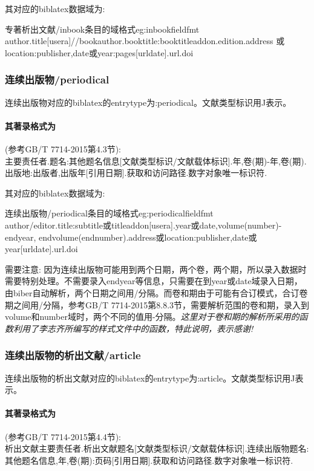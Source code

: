 其对应的biblatex数据域为:
\begin{codetex}{专著析出文献/inbook条目的域格式}{eg:inbookfieldfmt}
author.title[usera]//bookauthor.booktitle:booktitleaddon.edition.address 或location:publisher,date或year:pages[urldate].url.doi
\end{codetex}

\subsubsection{连续出版物/periodical}
\begin{refentry}{}{}
连续出版物对应的biblatex的entrytype为:periodical。文献类型标识用J表示。

\paragraph{其著录格式为}(参考GB/T 7714-2015第4.3节):\\
主要责任者.题名:其他题名信息[文献类型标识/文献载体标识].年,卷(期)-年,卷(期).出版地:出版者,出版年[引用日期].获取和访问路径.数字对象唯一标识符.
\end{refentry}

其对应的biblatex数据域为:
\begin{codetex}{连续出版物/periodical条目的域格式}{eg:periodicalfieldfmt}
author/editor.title:subtitle或titleaddon[usera].year或date,volume(number)-endyear, endvolume(endnumber).address或location:publisher,date或year[urldate].url.doi
\end{codetex}

需要注意: 因为连续出版物可能用到两个日期，两个卷，两个期，所以录入数据时需要特别处理。不需要录入endyear等信息，只需要在到year或date域录入日期，由biber自动解析，两个日期之间用/分隔。而卷和期由于可能有合订模式，合订卷期之间用/分隔，参考GB/T 7714-2015第8.8.3节，需要解析范围的卷和期，录入到volume和number域时，两个不同的值用-分隔。\emph{这里对于卷和期的解析所采用的函数利用了李志齐所编写的样式文件中的函数，特此说明，表示感谢!}

\subsubsection{连续出版物的析出文献/article}
\begin{refentry}{}{}
连续出版物的析出文献对应的biblatex的entrytype为:article。文献类型标识用J表示。

\paragraph{其著录格式为}(参考GB/T 7714-2015第4.4节):\\
析出文献主要责任者.析出文献题名[文献类型标识/文献载体标识].连续出版物题名:其他题名信息,年,卷(期):页码[引用日期].获取和访问路径.数字对象唯一标识符.
\end{refentry}

